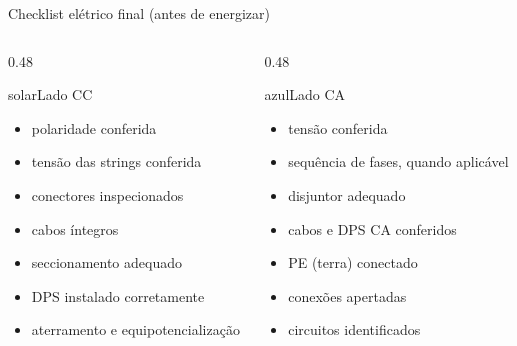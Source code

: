 \documentclass[aspectratio=169,10pt,xcolor=table]{beamer}
\begin{document}
\begin{frame}{Checklist elétrico final (antes de energizar)}
  \begin{columns}[T]
    \begin{column}{0.48\textwidth}
      \begin{card}[equal height group=ck]{solar}{\faSolarPanel\enspace Lado CC}
        \begin{itemize}
          \item polaridade conferida
          \item tensão das strings conferida
          \item conectores inspecionados
          \item cabos íntegros
          \item seccionamento adequado
          \item DPS instalado corretamente
          \item aterramento e equipotencialização
        \end{itemize}
      \end{card}
    \end{column}
    \begin{column}{0.48\textwidth}
      \begin{card}[equal height group=ck]{azul}{\faPlug\enspace Lado CA}
        \begin{itemize}
          \item tensão conferida
          \item sequência de fases, quando aplicável
          \item disjuntor adequado
          \item cabos e DPS CA conferidos
          \item PE (terra) conectado
          \item conexões apertadas
          \item circuitos identificados
        \end{itemize}
      \end{card}
    \end{column}
  \end{columns}
\end{frame}
\end{document}
